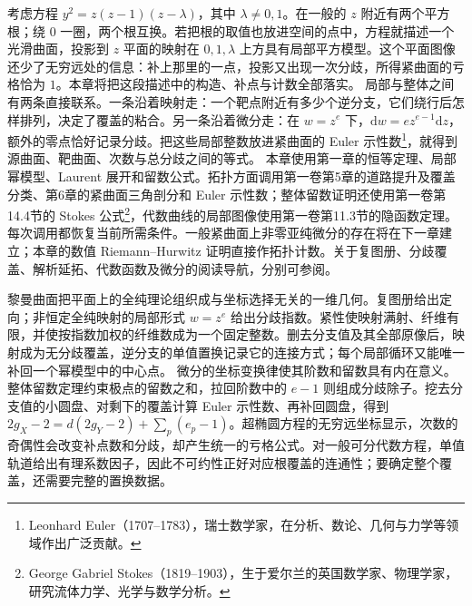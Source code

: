 考虑方程 \(y^2=z(z-1)(z-\lambda)\)，其中 \(\lambda\ne0,1\)。在一般的 \(z\) 附近有两个平方根；绕 \(0\) 一圈，两个根互换。若把根的取值也放进空间的点中，方程就描述一个光滑曲面，投影到 \(z\) 平面的映射在 \(0,1,\lambda\) 上方具有局部平方模型。这个平面图像还少了无穷远处的信息：补上那里的一点，投影又出现一次分歧，所得紧曲面的亏格恰为 \(1\)。本章将把这段描述中的构造、补点与计数全部落实。
\ProseParagraphBreak
局部与整体之间有两条直接联系。一条沿着映射走：一个靶点附近有多少个逆分支，它们绕行后怎样排列，决定了覆盖的粘合。另一条沿着微分走：在 \(w=z^e\) 下，\(\mathrm{d}w=e z^{e-1}\mathrm{d}z\)，额外的零点恰好记录分歧。把这些局部整数放进紧曲面的 Euler 示性数\footnote{Leonhard Euler（1707--1783），瑞士数学家，在分析、数论、几何与力学等领域作出广泛贡献。}，就得到源曲面、靶曲面、次数与总分歧之间的等式。
\ProseParagraphBreak
本章使用第一章的恒等定理、局部幂模型、Laurent 展开和留数公式。拓扑方面调用第一卷第5章的道路提升及覆盖分类、第6章的紧曲面三角剖分和 Euler 示性数；整体留数证明还使用第一卷第14.4节的 Stokes 公式\footnote{George Gabriel Stokes（1819--1903），生于爱尔兰的英国数学家、物理学家，研究流体力学、光学与数学分析。}，代数曲线的局部图像使用第一卷第11.3节的隐函数定理。每次调用都恢复当前所需条件。一般紧曲面上非零亚纯微分的存在将在下一章建立；本章的数值 Riemann--Hurwitz 证明直接作拓扑计数。关于复图册、分歧覆盖、解析延拓、代数函数及微分的阅读导航，分别可参阅\parencite[§§1--2, 4, 7--10]{Forster1981}。






\begin{chaptersummary}
	黎曼曲面把平面上的全纯理论组织成与坐标选择无关的一维几何。复图册给出定向；非恒定全纯映射的局部形式 \(w=z^e\) 给出分歧指数。紧性使映射满射、纤维有限，并使按指数加权的纤维数成为一个固定整数。删去分支值及其全部原像后，映射成为无分歧覆盖，逆分支的单值置换记录它的连接方式；每个局部循环又能唯一补回一个幂模型中的中心点。
	\ProseParagraphBreak
	微分的坐标变换律使其阶数和留数具有内在意义。整体留数定理约束极点的留数之和，拉回阶数中的 \(e-1\) 则组成分歧除子。挖去分支值的小圆盘、对剩下的覆盖计算 Euler 示性数、再补回圆盘，得到 \(2g_X-2=d(2g_Y-2)+\sum_p(e_p-1)\)。超椭圆方程的无穷远坐标显示，次数的奇偶性会改变补点数和分歧，却产生统一的亏格公式。对一般可分代数方程，单值轨道给出有理系数因子，因此不可约性正好对应根覆盖的连通性；要确定整个覆盖，还需要完整的置换数据。
\end{chaptersummary}

\BookExercises

